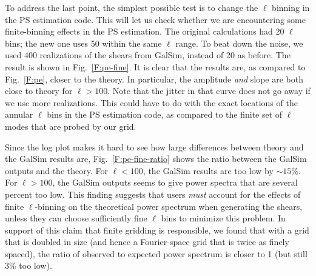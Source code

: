 \documentclass[preprint]{aastex}
\begin{document}
To address the last point, the simplest possible test is to
change the $\ell$ binning in the PS estimation code.  This will let us
check whether we are encountering some finite-binning effects in the
PS estimation.  The original calculations had 20 $\ell$ bins; the new
one uses 50 within the same $\ell$ range.  To beat down the noise, we
used 400 realizations of the shears from GalSim, instead of 20 as
before.  The result is shown in Fig.~\ref{F:pe-fine}.  It is clear
that the results are, as compared to Fig.~\ref{F:pe}, closer to the
theory.  In particular, the amplitude {\em and} slope are both close
to theory for $\ell>100$.  Note that the jitter in that curve does not
go away if we use more realizations.  This could have to do with the
exact locations of the annular $\ell$ bins in the PS estimation code,
as compared to the finite set of $\ell$ modes that are probed by our
grid.

Since the log plot makes it hard to see how large differences between
theory and the GalSim results are, Fig.~\ref{F:pe-fine-ratio} shows
the ratio between the GalSim outputs and the theory.  For $\ell<100$,
the GalSim results are too low by $\sim 15$\%.  For $\ell>100$, the
GalSim outputs seems to give power spectra that are several percent too low.  This
finding suggests that users {\em must} account for the effects of
finite $\ell$-binning on the theoretical power spectrum when
generating the shears, unless they
can choose sufficiently fine $\ell$ bins to minimize
this problem.  In support of this claim that finite gridding is
responsible, we found that with a grid that is doubled in size (and
hence a Fourier-space grid that is twice as finely spaced), the ratio
of observed to expected power spectrum is closer to 1 (but still 3\%
too low).
\end{document}
